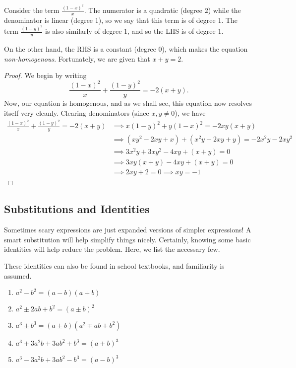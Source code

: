 \documentclass[../jarvis.tex]{subfiles}
\begin{document}
Consider the term $\frac{(1-x)^2}{x}$. The numerator is a quadratic (degree $2$) while the denominator is linear (degree $1$), so we say that this term is of degree $1$. The term $\frac{(1-y)^2}{y}$ is also similarly of degree $1$, and so the LHS is of degree $1$. 

On the other hand, the RHS is a constant (degree $0$), which makes the equation \textit{non-homogenous}. Fortunately, we are given that $x+y=2$. 

\begin{proof}
    We begin by writing
$$\frac{(1-x)^2}{x}+\frac{(1-y)^2}{y}=-2(x+y).$$ Now, our equation is homogenous, and as we shall see, this equation now resolves itself very cleanly. Clearing denominators (since $x,y \neq 0$), we have
\begin{align*}
    \frac{(1-x)^2}{x}+\frac{(1-y)^2}{y}=-2(x+y) &\implies x(1-y)^2+y(1-x)^2=-2xy(x+y) \\
    &\implies (xy^2-2xy+x)+(x^2y-2xy+y)=-2x^2y-2xy^2 \\
    &\implies 3x^2y+3xy^2-4xy+(x+y)=0 \\
    &\implies 3xy(x+y)-4xy+(x+y)=0 \\
    &\implies 2xy+2=0 \implies xy=\boxed{-1}
\end{align*}
\end{proof}

\subsection{Substitutions and Identities}
Sometimes scary expressions are just expanded versions of simpler expressions! A smart substitution will help simplify things nicely. Certainly, knowing some basic identities will help reduce the problem. Here, we list the necessary few.

\begin{proposition}
    These identities can also be found in school textbooks, and familiarity is assumed.
    \begin{enumerate}
        \item $a^2-b^2=(a-b)(a+b)$
        \item $a^2\pm 2ab+b^2=(a\pm b)^2$
        \item $a^3\pm b^3=(a\pm b)(a^2\mp ab+b^2)$
        \item $a^3+3a^2b+3ab^2+b^3=(a+b)^3$
        \item $a^3-3a^2b+3ab^2-b^3=(a-b)^3$
    \end{enumerate}
\end{proposition}
\end{document}

